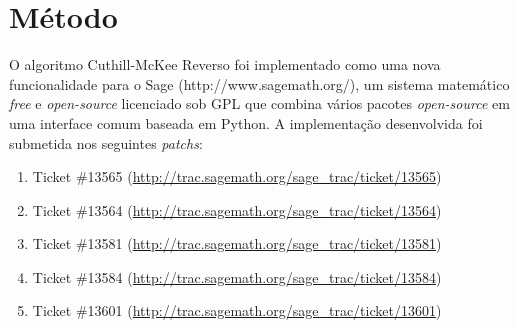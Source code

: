\section{Método}
O algoritmo Cuthill-McKee Reverso foi implementado como uma nova
funcionalidade para o Sage (http://www.sagemath.org/), um sistema
matemático \textit{free} e \textit{open-source} licenciado sob
GPL que combina vários pacotes \textit{open-source} em uma interface comum
baseada em Python. A implementação desenvolvida foi submetida nos
seguintes \textit{patchs}:
\begin{enumerate}
    \item Ticket \#13565
        (\url{http://trac.sagemath.org/sage_trac/ticket/13565})
    \item Ticket \#13564
        (\url{http://trac.sagemath.org/sage_trac/ticket/13564})
    \item Ticket \#13581
        (\url{http://trac.sagemath.org/sage_trac/ticket/13581})
    \item Ticket \#13584
        (\url{http://trac.sagemath.org/sage_trac/ticket/13584})
    \item Ticket \#13601
        (\url{http://trac.sagemath.org/sage_trac/ticket/13601})
\end{enumerate}
